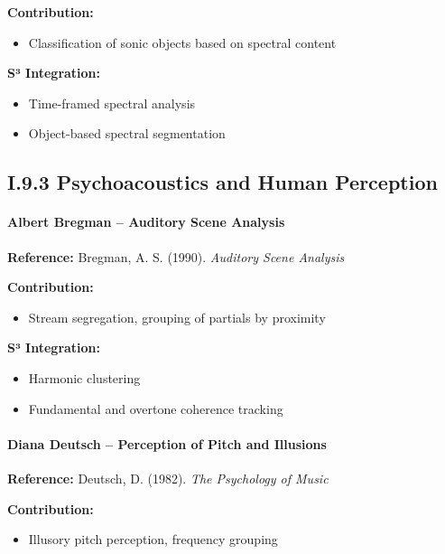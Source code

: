 \textbf{Contribution:}

\begin{itemize}
    \item Classification of sonic objects based on spectral content
\end{itemize}

\textbf{S³ Integration:}

\begin{itemize}
    \item Time-framed spectral analysis
    \item Object-based spectral segmentation
\end{itemize}

\subsection*{I.9.3 Psychoacoustics and Human Perception}

\paragraph{Albert Bregman – Auditory Scene Analysis}

\textbf{Reference:} Bregman, A. S. (1990). \textit{Auditory Scene Analysis}

\textbf{Contribution:}

\begin{itemize}
    \item Stream segregation, grouping of partials by proximity
\end{itemize}

\textbf{S³ Integration:}

\begin{itemize}
    \item Harmonic clustering
    \item Fundamental and overtone coherence tracking
\end{itemize}

\paragraph{Diana Deutsch – Perception of Pitch and Illusions}

\textbf{Reference:} Deutsch, D. (1982). \textit{The Psychology of Music}

\textbf{Contribution:}

\begin{itemize}
    \item Illusory pitch perception, frequency grouping
\end{itemize}


